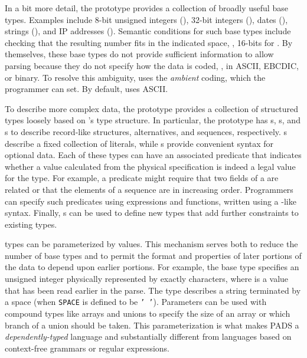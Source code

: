 In a bit more detail,
the \pads{} prototype provides a collection of broadly useful base
types.  Examples include 8-bit unsigned integers (), 32-bit
integers (), dates (), strings (),
and IP addresses ().  Semantic conditions for such base types
include checking that the resulting number fits in the indicated
space, \ie, 16-bits for .  By themselves, these base types
do not provide sufficient information to allow parsing because they do
not specify how the data is coded, \ie{}, in ASCII, EBCDIC, or binary.
To resolve this ambiguity, \pads{} uses the \textit{ambient} coding,
which the programmer can set.  By default, \pads{} uses ASCII.  

To describe more complex data, the prototype provides a collection of
structured types loosely based on \C{}'s type structure.  In
particular, the prototype has s, s, and s
to describe record-like structures, alternatives, and sequences,
respectively.  s describe a fixed collection of literals,
while s provide convenient syntax for optional data.  Each of
these types can have an associated predicate that indicates whether a
value calculated from the physical specification is indeed a legal
value for the type.  For example, a predicate might require that two
fields of a  are related or that the elements of a
sequence are in increasing order.  Programmers can specify such
predicates using \pads{} expressions and functions, written using a
\C{}-like syntax.  Finally, \pads{} s can be used to
define new types that add further constraints to existing types.

\pads{} types can be parameterized by values.  This mechanism serves
both to reduce the number of base types and to permit the format and
properties of later portions of the data to depend upon earlier
portions.  For example, the base type  specifies
an unsigned integer physically represented by exactly 
characters, where  is a value that has been read earlier in the
parse.  The type  describes a string
terminated by a space (when \texttt{SPACE} is defined to be \texttt{' '}).  
Parameters can be used with compound types like arrays and unions to
specify the size of an array or which branch of a union should be
taken.  This parameterization is what makes PADS a {\em dependently-typed}
language and substantially different from languages based on
context-free grammars or regular expressions.

